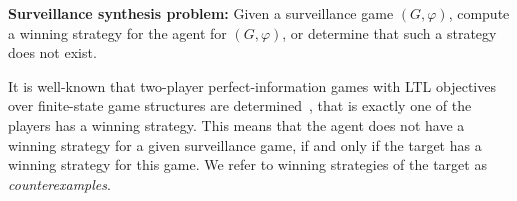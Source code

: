 \bigskip
{\bf Surveillance synthesis problem:} Given a surveillance game $(G,\varphi)$, compute a winning strategy for the agent for $(G,\varphi)$, or determine that such a strategy does not exist.


It is well-known that two-player perfect-information games with LTL objectives over finite-state game structures are determined~\cite{BorelDeterminacy}, that is exactly one of the players has a winning strategy. This means that the agent does not have a winning strategy for a given surveillance game, if and only if the target has a winning strategy for this game. We refer to winning strategies of the target as \emph{counterexamples}.